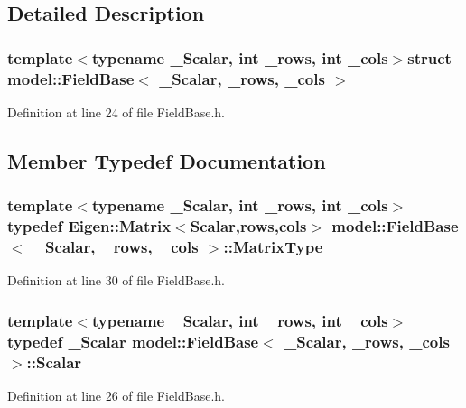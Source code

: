 \subsection{Detailed Description}
\subsubsection*{template$<$typename \+\_\+\+Scalar, int \+\_\+rows, int \+\_\+cols$>$struct model\+::\+Field\+Base$<$ \+\_\+\+Scalar, \+\_\+rows, \+\_\+cols $>$}



Definition at line 24 of file Field\+Base.\+h.



\subsection{Member Typedef Documentation}
\hypertarget{structmodel_1_1_field_base_a2a46afe1dafac6e3d1c95d32fc9a58a3}{}
\subsubsection[{Matrix\+Type}]{\setlength{\rightskip}{0pt plus 5cm}template$<$typename \+\_\+\+Scalar, int \+\_\+rows, int \+\_\+cols$>$ typedef Eigen\+::\+Matrix$<${\bf Scalar},{\bf rows},{\bf cols}$>$ {\bf model\+::\+Field\+Base}$<$ \+\_\+\+Scalar, \+\_\+rows, \+\_\+cols $>$\+::{\bf Matrix\+Type}}\label{structmodel_1_1_field_base_a2a46afe1dafac6e3d1c95d32fc9a58a3}


Definition at line 30 of file Field\+Base.\+h.

\hypertarget{structmodel_1_1_field_base_a7719dfb862a0e36c4a1717654d1997b2}{}
\subsubsection[{Scalar}]{\setlength{\rightskip}{0pt plus 5cm}template$<$typename \+\_\+\+Scalar, int \+\_\+rows, int \+\_\+cols$>$ typedef \+\_\+\+Scalar {\bf model\+::\+Field\+Base}$<$ \+\_\+\+Scalar, \+\_\+rows, \+\_\+cols $>$\+::{\bf Scalar}}\label{structmodel_1_1_field_base_a7719dfb862a0e36c4a1717654d1997b2}


Definition at line 26 of file Field\+Base.\+h.



